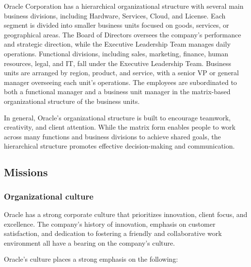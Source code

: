 Oracle Corporation has a hierarchical organizational structure with several main business divisions, including Hardware, Services, Cloud, and License. Each segment is divided into smaller business units focused on goods, services, or geographical areas. The Board of Directors oversees the company's performance and strategic direction, while the Executive Leadership Team manages daily operations. Functional divisions, including sales, marketing, finance, human resources, legal, and IT, fall under the Executive Leadership Team. Business units are arranged by region, product, and service, with a senior VP or general manager overseeing each unit's operations. The employees are subordinated to both a functional manager and a business unit manager in the matrix-based organizational structure of the business units.

In general, Oracle's organizational structure is built to encourage teamwork, creativity, and client attention. While the matrix form enables people to work across many functions and business divisions to achieve shared goals, the hierarchical structure promotes effective decision-making and communication.

\subsection{Missions}
\label{subsec:host_missions}

\subsubsection*{Organizational culture}

Oracle has a strong corporate culture that prioritizes innovation, client focus, and excellence. The company's history of innovation, emphasis on customer satisfaction, and dedication to fostering a friendly and collaborative work environment all have a bearing on the company's culture.

Oracle's culture places a strong emphasis on the following:

